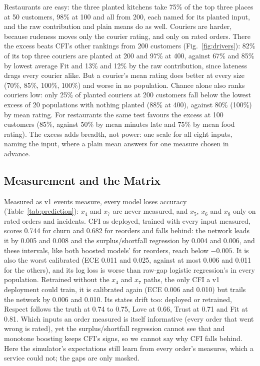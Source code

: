 \documentclass[10pt,twocolumn,letterpaper]{article}
\begin{document}
Restaurants are easy: the three planted kitchens take 75\% of the top three places at 50 customers, 98\% at 100 and all from 200, each named for its planted input, and the raw contribution and plain means do as well. Couriers are harder, because rudeness moves only the courier rating, and only on rated orders. There the excess beats CFI's other rankings from 200 customers (Fig.~\ref{fig:drivers}): 82\% of its top three couriers are planted at 200 and 97\% at 400, against 67\% and 85\% by lowest average Fit and 13\% and 12\% by the raw contribution, since lateness drags every courier alike. But a courier's mean rating does better at every size (70\%, 85\%, 100\%, 100\%) and worse in no population. Chance alone also ranks couriers low: only 25\% of planted couriers at 200 customers fall below the lowest excess of 20 populations with nothing planted (88\% at 400), against 80\% (100\%) by mean rating. For restaurants the same test favours the excess at 100 customers (85\%, against 50\% by mean minutes late and 75\% by mean food rating). The excess adds breadth, not power: one scale for all eight inputs, naming the input, where a plain mean answers for one measure chosen in advance.

\subsection{Measurement and the Matrix}\label{sec:matrix}

Measured as v1 events measure, every model loses accuracy (Table~\ref{tab:prediction}): $x_4$ and $x_7$ are never measured, and $x_5$, $x_6$ and $x_8$ only on rated orders and incidents. CFI as deployed, trained with every input measured, scores 0.744 for churn and 0.682 for reorders and falls behind: the network leads it by 0.005 and 0.008 and the surplus/shortfall regression by 0.004 and 0.006, and these intervals, like both boosted models' for reorders, reach below $-0.005$. It is also the worst calibrated (ECE 0.011 and 0.025, against at most 0.006 and 0.011 for the others), and its log loss is worse than raw-gap logistic regression's in every population. Retrained without the $x_4$ and $x_7$ paths, the only CFI a v1 deployment could train, it is calibrated again (ECE 0.006 and 0.010) but trails the network by 0.006 and 0.010. Its states drift too: deployed or retrained, Respect follows the truth at 0.74 to 0.75, Love at 0.66, Trust at 0.71 and Fit at 0.81. Which inputs an order measured is itself informative (every order that went wrong is rated), yet the surplus/shortfall regression cannot see that and monotone boosting keeps CFI's signs, so we cannot say why CFI falls behind. Here the simulator's expectations still learn from every order's measures, which a service could not; the gaps are only masked.
\end{document}
